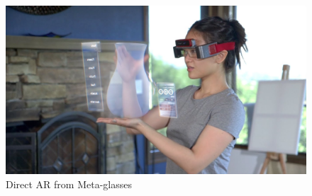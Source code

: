 \documentclass[12pt,twocolumn,letterpaper]{article}
\begin{document}
\begin{figure}
\includegraphics[scale=0.16]{images/mata}
\caption{Direct AR from Meta-glasses}
\label{fig:directar}
\end{figure}
\end{document}
